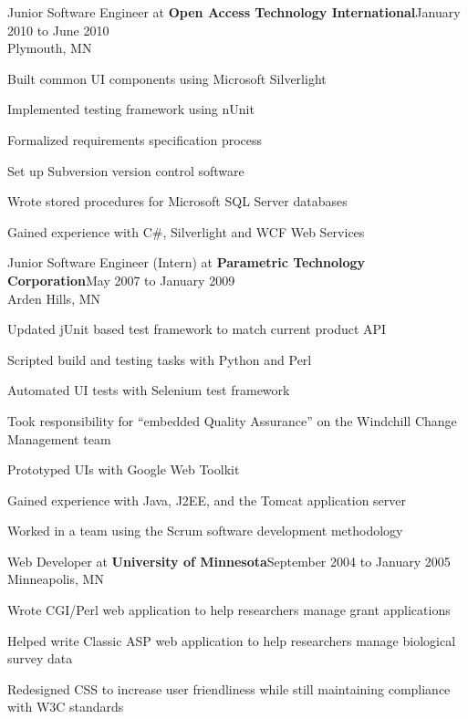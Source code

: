 \documentclass[letterpaper]{article}
\newenvironment{resume-list}
{\begin{itemize}
 \setlength{\itemsep}{0pt}
 \setlength{\parskip}{0pt}}
{\end{itemize}}
\begin{document}
\noindent Junior Software Engineer at {\bfseries Open Access Technology International}\dotfill January 2010 to June 2010\\
Plymouth, MN
\begin{resume-list}
\item Built common UI components using Microsoft Silverlight
\item Implemented testing framework using nUnit
\item Formalized requirements specification process
\item Set up Subversion version control software
\item Wrote stored procedures for Microsoft SQL Server databases
\item Gained experience with C\#, Silverlight and WCF Web Services
\end{resume-list}
\noindent Junior Software Engineer (Intern) at {\bfseries Parametric Technology Corporation}\dotfill May 2007 to January 2009\\
Arden Hills, MN
\begin{resume-list}
\item Updated jUnit based test framework to match current product API
\item Scripted build and testing tasks with Python and Perl
\item Automated UI tests with Selenium test framework
\item Took responsibility for ``embedded Quality Assurance'' on the Windchill Change Management team
\item Prototyped UIs with Google Web Toolkit
\item Gained experience with Java, J2EE, and the Tomcat application server
\item Worked in a team using the Scrum software development methodology
\end{resume-list}
\noindent Web Developer at {\bfseries University of Minnesota}\dotfill September 2004 to January 2005\\
Minneapolis, MN
\begin{resume-list}
\item Wrote CGI/Perl web application to help researchers manage grant applications
\item Helped write Classic ASP web application to help researchers manage biological survey data
\item Redesigned CSS to increase user friendliness while still maintaining compliance with W3C standards
\end{resume-list}
\end{document}
